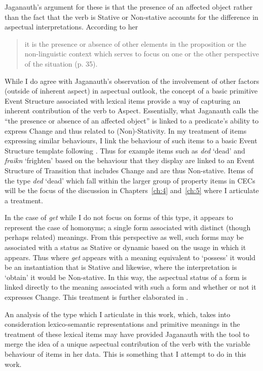 Jaganauth’s argument for these is that the presence of an affected
object rather than the fact that the verb is Stative or Non-stative
accounts for the difference in aspectual interpretations.  According
to her

\begin{quote}
it is the presence or absence of other elements in the proposition or
the non-linguistic context which serves to focus on one or the other
perspective of the situation (p. 35).
\end{quote}

While I do agree with Jaganauth’s observation of the involvement of
other factors (outside of inherent aspect) in aspectual outlook, the
concept of a basic primitive Event Structure associated with lexical
items provide a way of capturing an inherent contribution of the verb
to Aspect.  Essentially, what Jaganauth calls the “the presence or
absence of an affected object” is linked to a predicate’s ability to
express Change and thus related to (Non)-Stativity.  In my treatment
of items expressing similar behaviours, I link the behaviour of such
items to a basic Event Structure template following \citet{Pustejovsky1988,Pustejovsky1991}.  Thus for example items such as \textit{ded} `dead' and
\textit{fraikn} `frighten' based on the behaviour that they display
are linked to an Event Structure of Transition that includes Change
and are thus Non-stative.  Items of the type \textit{ded} `dead' which
fall within the larger group of property items in CECs will be the
focus of the discussion in Chapters~\ref{ch:4} and~\ref{ch:5} where I articulate a
treatment.

In the case of \textit{get} while I do not focus on forms of this
type, it appears to represent the case of homonyms; a single form
associated with distinct (though perhaps related) meanings.  From this
perspective as well, such forms may be associated with a status as
Stative or dynamic based on the usage in which it appears.  Thus where
\textit{get} appears with a meaning equivalent to `possess' it would
be an instantiation that is Stative and likewise, where the
interpretation is `obtain' it would be Non-stative.  In this way, the
aspectual status of a form is linked directly to the meaning
associated with such a form and whether or not it expresses Change.
This treatment is further elaborated in .

An analysis of the type which I articulate in this work, which, takes
into consideration lexico-semantic representations and primitive
meanings in the treatment of these lexical items may have provided Jaganauth
with the tool to merge the idea of a unique aspectual contribution of
the verb with the variable behaviour of items in her data.  This is
something that I attempt to do in this work.

